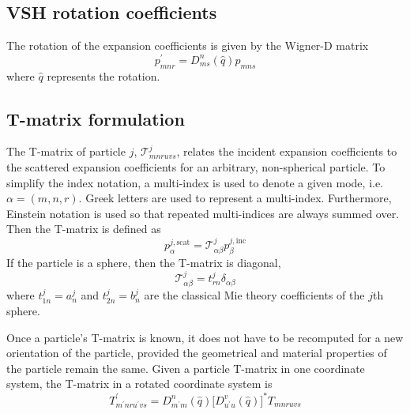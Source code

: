 \documentclass[11pt]{article}
\begin{document}
\subsection{VSH rotation coefficients}
The rotation of the expansion coefficients is given by the Wigner-D matrix
\begin{equation}
    p_{mnr}^\prime = D_{ms}^{n}(\hat q) p_{mns}
\end{equation}
where $\hat q$ represents the rotation.

\subsection{T-matrix formulation}
\newcommand{\tmatrix}{\mathcal{T}}
The T-matrix of particle $j$, $\tmatrix_{mnruvs}^j$, relates the incident expansion coefficients to the scattered expansion coefficients for an arbitrary, non-spherical particle.
To simplify the index notation, a multi-index is used to denote a given mode, i.e.\ $\alpha = (m,n,r)$.
Greek letters are used to represent a multi-index.
Furthermore, Einstein notation is used so that repeated multi-indices are always summed over.
Then the T-matrix is defined as
\begin{equation}
    p_\alpha^{j,\text{scat}} = \tmatrix_{\alpha\beta}^j p_\beta^{j,\text{inc}}
\label{eqn:tmatrix_defintion}
\end{equation}
If the particle is a sphere, then the T-matrix is diagonal,
\begin{equation}
    \tmatrix_{\alpha\beta}^j = t_{rn}^j \delta_{\alpha\beta}
\label{eqn:tmatrix_sphere}
\end{equation}
where $t_{1n}^j = a_n^j$ and $t_{2n}^j = b_n^j$ are the classical Mie theory coefficients of the $j$th sphere.\cite{bohren2008absorption}

Once a particle's T-matrix is known, it does not have to be recomputed for a new orientation of the particle, provided the geometrical and material properties of the particle remain the same.
Given a particle T-matrix in one coordinate system, the T-matrix in a rotated coordinate system is
\begin{equation}
    T_{m^\prime nr u^\prime vs}^\prime = D_{m^\prime m}^n(\hat q) \lbrack D_{u^\prime u}^v(\hat q) \rbrack^* T_{mnruvs}
\end{equation}
\end{document}
